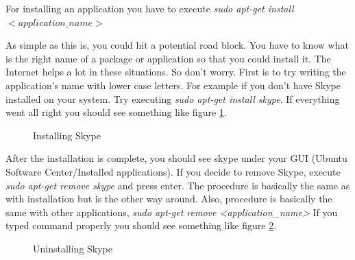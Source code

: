 \par \noindent For installing an application  you have to execute \textit{sudo apt-get install $<application\_name>$ }\\

\par \noindent As simple as this is, you could hit a potential road block. You have to know what is the right name of a package or application so that you could install it. The Internet helps a lot in these situations. So don't worry. First is to try writing the application's name with lower case letters. For example if you don't have Skype installed on your system. Try executing \textit{sudo apt-get install skype}. If everything went all right you should see something like figure \ref{fig:install-skype}. \\

\begin{figure}[h!]	
	\centering
	\caption{Installing Skype}	
	\label{fig:install-skype}	
\end{figure}

\par \noindent After the installation is complete, you should see skype under your GUI (Ubuntu Software Center/Installed applications). 
If you decide to remove Skype, execute \textit{sudo apt-get remove skype} and press enter. The procedure is basically the same as with installation but is the other way around. Also, procedure is basically the same with other applications, \textit{ sudo apt-get remove <application\_name>} If you  typed command properly you should see something like figure \ref{fig:uninstall-skype}. \\

\begin{figure}[h!]	
	\centering
	\caption{Uninstalling Skype}	
	\label{fig:uninstall-skype}	
\end{figure}

